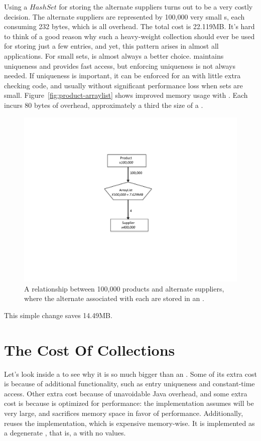 Using a $HashSet$ for storing the alternate suppliers turns out to be a very
costly decision. The alternate suppliers are represented by 100,000
very small s, each consuming 232 bytes, which is all overhead.
The total cost is 22.119MB. 
It's hard to think of a good reason why such a heavy-weight collection should ever be used
 for storing just a few entries, and yet, this pattern arises in almost all
 applications. For small sets,  is almost always a better choice. 
  maintains uniqueness
  and provides fast access, but enforcing uniqueness
is not always needed. If uniqueness is
important, it can be enforced for an  
 with  little extra checking code, and usually without significant performance
 loss when sets are small. Figure~\ref{fig:product-arraylist} shows improved
 memory usage with . Each  incurs 80 bytes of overhead,
approximately a third the size of a .
 \begin{figure}
  \centering
 \includegraphics[width=.80\textwidth]{part1/Figures/collections/product-arraylist.pdf}
 \caption{A relationship between 100,000 products and alternate suppliers,
 where the alternate  associated with each  are
 stored in an .}
  \label{fig:graph-arraylist}
\end{figure}
This simple change saves 14.49MB. 


\section{The Cost Of Collections}
\label{sec:collectioncost}
Let's look inside a  to see why it is so much bigger than an
. Some of its extra cost is because of additional
functionality, such as entry uniqueness and constant-time access. Other extra
cost because of unavoidable Java overhead, and some extra cost is because
 is optimized for performance: the  implementation
assumes  will be very large, and sacrifices memory space in favor of performance. 
Additionally,  reuses the  implementation, which
is expensive memory-wise. It is implemented as a degenerate ,
that is, a  with no values. 

